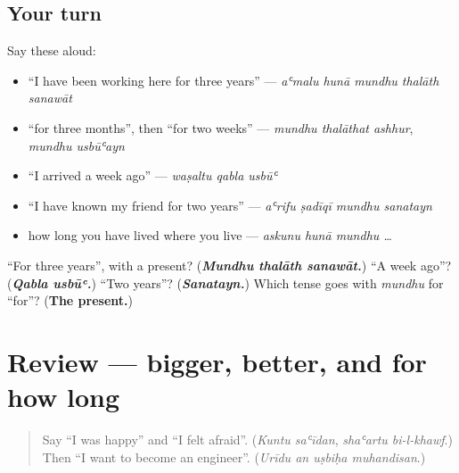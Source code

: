 \subsection*{Your turn}
Say these aloud:

\begin{itemize}
\raggedright
  \item \textquotedblleft{}I have been working here for three years\textquotedblright{} — \emph{aʿmalu hunā mundhu thalāth sanawāt}
  \item \textquotedblleft{}for three months\textquotedblright{}, then \textquotedblleft{}for two weeks\textquotedblright{} — \emph{mundhu thalāthat ashhur}, \emph{mundhu usbūʿayn}
  \item \textquotedblleft{}I arrived a week ago\textquotedblright{} — \emph{waṣaltu qabla usbūʿ}
  \item \textquotedblleft{}I have known my friend for two years\textquotedblright{} — \emph{aʿrifu ṣadīqī mundhu sanatayn}
  \item how long you have lived where you live — \emph{askunu hunā mundhu …}
\end{itemize}

\begin{tcolorbox}[breakable,colback=teal!4,colframe=teal!35!black,title={Before you move on}]
\textquotedblleft{}For three years\textquotedblright{}, with a present? (\emph{\textbf{Mundhu thalāth sanawāt.}}) \textquotedblleft{}A week ago\textquotedblright{}? (\emph{\textbf{Qabla usbūʿ.}}) \textquotedblleft{}Two years\textquotedblright{}? (\emph{\textbf{Sanatayn.}}) Which tense goes with \emph{mundhu} for \textquotedblleft{}for\textquotedblright{}? (\textbf{The present.})
\end{tcolorbox}
\section[(review)]{Review — bigger, better, and for how long}

\label{lesson:AR-R290-comparing-and-time}



\begin{quote}
Say \textquotedblleft{}I was happy\textquotedblright{} and \textquotedblleft{}I felt afraid\textquotedblright{}. (\emph{Kuntu saʿīdan}, \emph{shaʿartu bi-l-khawf}.) Then \textquotedblleft{}I want to become an engineer\textquotedblright{}. (\emph{Urīdu an uṣbiḥa muhandisan}.)
\end{quote}

